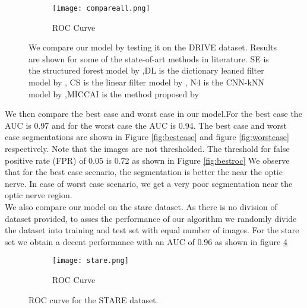 \begin{figure}
	\centering
	
	\begin{subfigure}[b]{0.75\textwidth}
		\texttt{[image: compareall.png]}
		\caption{ROC Curve}
		\label{fig:com}
	\end{subfigure}
	\caption[Results on DRIVE dataset]{We compare our model by testing it on the DRIVE dataset. Results are shown for some of the state-of-art methods in literature. SE is the structured forest model by \citet{dollar2013structured},DL is the dictionary leaned filter model by \citet{rigamonti2013learning}, CS is the linear filter model by \citet{rigamonti2012accurate}, N4 is the CNN-kNN model by \citet{ganin2014n},MICCAI is the method proposed by \citet{becker2013supervised}}
	\label{fig:compareall}

\end{figure}
We then compare the best case and worst case in our model.For the best case the AUC is 0.97 and for the worst case the AUC is 0.94. The best case and worst case segmentations are shown in Figure \ref{fig:bestcase} and figure \ref{fig:worstcase} respectively. Note that the images are not thresholded. The threshold for false positive rate (FPR) of 0.05 is 0.72 as shown in Figure \ref{fig:bestroc} We observe that for the best case scenario, the segmentation is better the near the optic nerve. In case of worst case scenario, we get a very poor segmentation near the optic nerve region.\\

We also compare our model on the stare dataset. As there is no division of dataset provided, to asses the performance of our algorithm we randomly divide the dataset into training and test set with equal number of images. For the stare set we obtain a decent performance with an AUC of 0.96 as shown in figure \ref{fig:stare}
\begin{figure}
	\centering
	
	\begin{subfigure}[b]{0.75\textwidth}
		\texttt{[image: stare.png]}
		\caption{ROC Curve}
		\label{fig:stare1}
	\end{subfigure}
	\caption[ROC curve on a train test split of STARE dataset]{ROC curve for the STARE dataset.}
	\label{fig:stare}
\end{figure}

